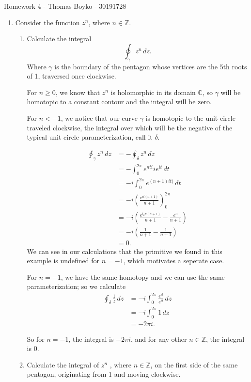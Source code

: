 \documentclass{article}
\begin{document}
    \huge Homework 4 - Thomas Boyko - 30191728
    \normalsize
\begin{enumerate} 
\item Consider the function $z^n$, where $n \in  \mathbb{Z}$.
\begin{enumerate}[label= (\alph*)] 
    \item Calculate the integral 
        \[
            \oint_{\gamma}z^{n} \, dz 
        .\] 
        Where $\gamma$ is the boundary of the
pentagon whose vertices are the 5th roots of 1, traversed once
clockwise.

For $n\ge 0$, we know that $z^{n}$ is holomorphic in its domain $\mathbb{C}$, so $\gamma$ will be homotopic to
a constant contour and the integral will be zero.

For $n<-1$, we notice that our curve $\gamma$ is homotopic to the unit circle traveled clockwise, the integral over which will be
the negative of the typical unit circle parameterization, call it $\delta$.

\begin{align*}
    \oint_{\gamma}z^{n} \, dz &= -\oint_{\delta} z^{n} \, d z  \\
    &= -\int_{0}^{2\pi} e^{nti}ie^{it} \, d t  \\
    &= -i\int_{0}^{2\pi} e^{(n+1)it)}\, d t  \\
    &= -i \left( \frac{e^{it(n+1)}}{n+1} \right)_{0}^{2\pi} \\
    &= -i\left( \frac{e^{i_2\pi(n+1)}}{n+1}-\frac{e^{0}}{n+1} \right)  \\
    &= -i\left(\frac{1}{n+1}-\frac{1}{n+1}\right) \\
    &= 0
.\end{align*}
We can see in our calculations that the primitive we found in this example is undefined for $n=-1$, which
motivates a seperate case.

For $n=-1$, we have the same homotopy and we can use the same parameterization; so we calculate
\begin{align*}
    \oint_{\delta} \frac{1}{z} \, d z &= -i\int_{0}^{2\pi} \frac{e^{it}}{e^{it}} \, d z  \\
    &= -i \int_{0}^{2\pi} 1 \, d z  \\
    &= -2\pi i 
.\end{align*}

So for $n=-1$, the integral is $-2\pi i$, and for any other $n\in \mathbb{Z}$, the integral is 0.

\item Calculate the integral of $z^n$ , where $n \in \mathbb{Z}$, on the first side of the same pentagon, originating from 1 and moving clockwise.


\end{enumerate}
\end{enumerate}
\end{document}
